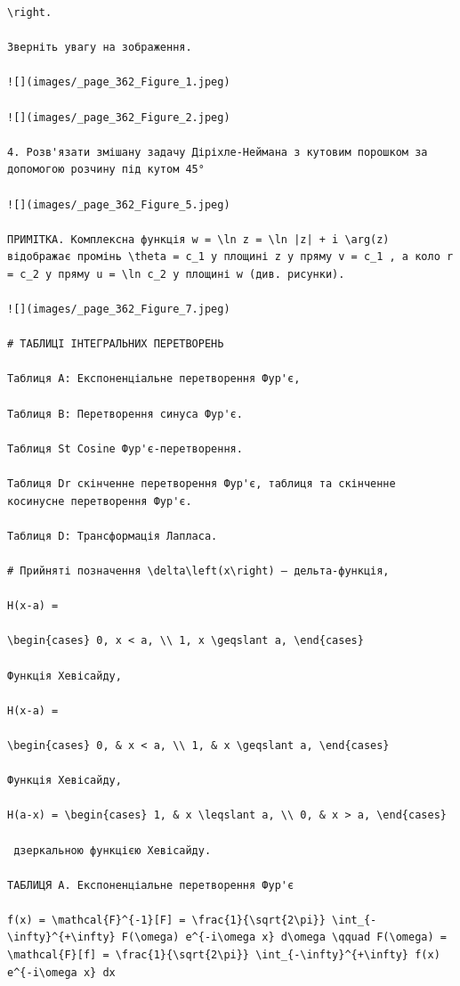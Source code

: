\documentclass[
  ukrainian,
]{article}
\begin{document}
\begin{verbatim}
\right.

Зверніть увагу на зображення.

![](images/_page_362_Figure_1.jpeg)

![](images/_page_362_Figure_2.jpeg)

4. Розв'язати змішану задачу Діріхле-Неймана з кутовим порошком за допомогою розчину під кутом 45°

![](images/_page_362_Figure_5.jpeg)

ПРИМІТКА. Комплексна функція w = \ln z = \ln |z| + i \arg(z) відображає промінь \theta = c_1 у площині z у пряму v = c_1 , а коло r = c_2 у пряму u = \ln c_2 у площині w (див. рисунки).

![](images/_page_362_Figure_7.jpeg)

# ТАБЛИЦІ ІНТЕГРАЛЬНИХ ПЕРЕТВОРЕНЬ

Таблиця A: Експоненціальне перетворення Фур'є,

Таблиця B: Перетворення синуса Фур'є.

Таблиця St Cosine Фур'є-перетворення.

Таблиця Dr скінченне перетворення Фур'є, таблиця та скінченне косинусне перетворення Фур'є.

Таблиця D: Трансформація Лапласа.

# Прийняті позначення \delta\left(x\right) — дельта-функція,

H(x-a) =

\begin{cases} 0, x < a, \\ 1, x \geqslant a, \end{cases}

Функція Хевісайду,

H(x-a) =

\begin{cases} 0, & x < a, \\ 1, & x \geqslant a, \end{cases}

Функція Хевісайду, 

H(a-x) = \begin{cases} 1, & x \leqslant a, \\ 0, & x > a, \end{cases}

 дзеркальною функцією Хевісайду.

ТАБЛИЦЯ A. Експоненціальне перетворення Фур'є

f(x) = \mathcal{F}^{-1}[F] = \frac{1}{\sqrt{2\pi}} \int_{-\infty}^{+\infty} F(\omega) e^{-i\omega x} d\omega \qquad F(\omega) = \mathcal{F}[f] = \frac{1}{\sqrt{2\pi}} \int_{-\infty}^{+\infty} f(x) e^{-i\omega x} dx


\end{verbatim}
\end{document}
